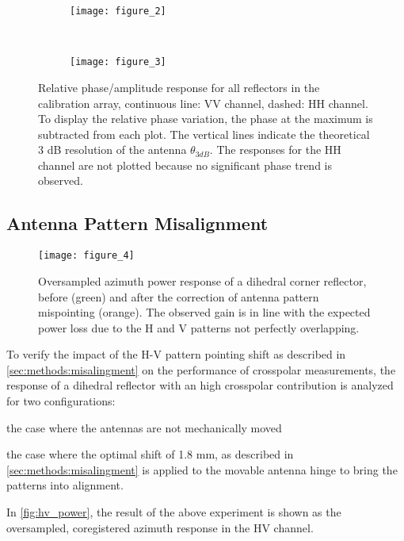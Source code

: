 \begin{figure*}[ht]
	\centering
	\begin{subfigure}[t]{\textwidth}
		\centering
		\texttt{[image: figure\_2]}
		\label{fig:phase_response_VV:uncorrected}
	\end{subfigure}\\
	\begin{subfigure}[t]{\textwidth}
		\centering
		\texttt{[image: figure\_3]}
		\label{fig:phase_response_VV:corrected}
	\end{subfigure}
	\caption{Relative phase/amplitude response for all reflectors in the calibration array, continuous line: VV channel, dashed: HH channel. To display the relative phase variation, the phase at the maximum is subtracted from each plot. The vertical lines indicate the theoretical 3 dB resolution of the antenna $\theta_{3dB}$. The responses for the HH channel are not plotted because no significant phase trend is observed.}
	\label{fig:phase_response_VV}
\end{figure*}

\subsection{Antenna Pattern Misalignment}\label{sec:results:misalignment}
\begin{figure*}[ht!]
	\centering
	\texttt{[image: figure\_4]}
	\caption{Oversampled azimuth power response of a dihedral corner reflector, before (green) and after the correction of antenna pattern mispointing (orange). The observed gain is in line with the expected power loss due to the H and V patterns not perfectly overlapping.}
	\label{fig:hv_power}
\end{figure*}
To verify the impact of the H-V pattern pointing shift as described in \autoref{sec:methods:misalingment} on the performance of crosspolar measurements, the response of a dihedral reflector with an high crosspolar contribution is analyzed for two configurations:\\ \begin{enumerate*}\item the case where the antennas are not mechanically moved \item the case where the optimal shift of 1.8 mm, as described in \autoref{sec:methods:misalingment} is applied to the movable antenna hinge to bring the patterns into alignment.\\ 
\end{enumerate*}
In \autoref{fig:hv_power}, the result of the above experiment is shown as the oversampled, coregistered azimuth response in the HV channel.
